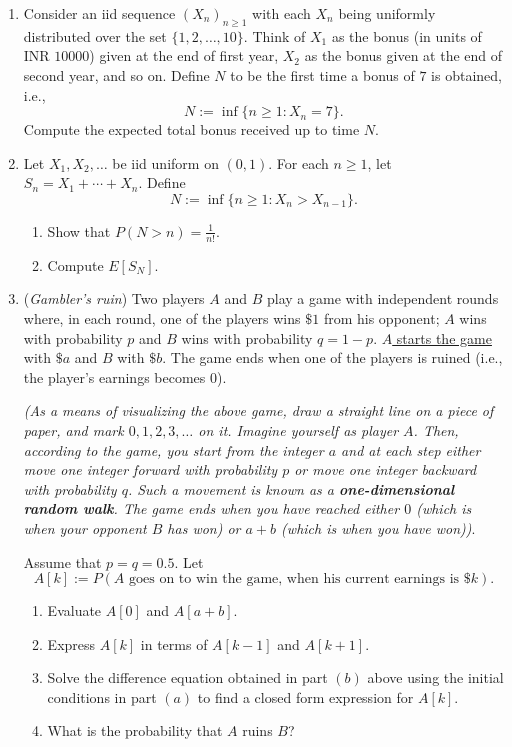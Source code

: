 \documentclass[10pt]{article}
\begin{document}
\begin{enumerate}
\item Consider an iid sequence $(X_n)_{n\geq 1}$ with each $X_{n}$ being uniformly distributed over the set $\{1,2,\ldots,10\}$. Think of $X_{1}$ as the bonus (in units of INR $10000$) given at the end of first year, $X_{2}$ as the bonus given at the end of second year, and so on. Define $N$ to be the first time a bonus of $7$ is obtained, i.e.,
\begin{equation*}
N:=\inf\{n\geq 1:X_{n}=7\}.
\end{equation*}
Compute the expected total bonus received up to time $N$. 

\item Let $X_{1},X_{2},\ldots$ be iid uniform on $(0,1)$. For each $n\geq 1$, let $S_{n}=X_{1}+\cdots+X_{n}$. Define
\begin{equation*}
N:=\inf\{n\geq 1:X_{n}>X_{n-1}\}.
\end{equation*}
\begin{enumerate}
	\item Show that $P(N>n)=\frac{1}{n!}$.
	\item Compute $E[S_{N}]$.
\end{enumerate}

\item (\emph{Gambler's ruin}) Two players $A$ and $B$ play a game with independent rounds where, in each round, one
of the players wins $ \$ 1 $  from his opponent; $ A $ wins with probability $ p $ and $ B $ wins with probability $ q = 1 - p $. \underline{$ A $ starts the game} with $ \$a $  and $ B $ with $ \$b $. The game ends when one of the players is ruined (i.e., the player's earnings becomes $0$).

\emph{(As a means of visualizing the above game, draw a straight line on a piece of paper, and mark $0,1,2,3,\ldots$ on it. Imagine yourself as player $A$. Then, according to the game, you start from the integer $a$ and at each step either move one integer forward with probability $p$ or move one integer backward with probability $q$. Such a movement is known as a \textbf{one-dimensional random walk}. The game ends when you have reached either $0$ (which is when your opponent $B$ has won) or $a+b$ (which is when you have won))}.

Assume that $p=q=0.5$. Let 
\begin{equation*}
A[k]:=P(A\text{ goes on to win the game, when his current earnings is }\$k).
\end{equation*}
\begin{enumerate}
	\item Evaluate $A[{0}]$ and $A[{a+b}]$.
	\item Express $A[k]$ in terms of $A[k-1]$ and $A[k+1]$.
	\item Solve the difference equation obtained in part $(b)$ above using the initial conditions in part $(a)$ to find a closed form expression for $A[k]$.
	\item What is the probability that $A$ ruins $B$?
\end{enumerate}


\end{enumerate}
\end{document}
